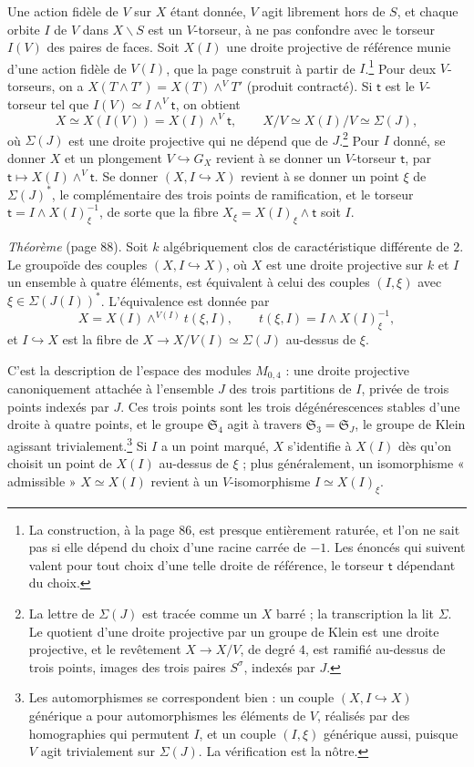 \documentclass[11pt,a4paper]{article}
\begin{document}
Une action fidèle de $V$ sur $X$ étant donnée, $V$ agit librement hors de $S$,
et chaque orbite $I$ de $V$ dans $X \smallsetminus S$ est un $V$-torseur, à ne
pas confondre avec le torseur $I(V)$ des paires de faces. Soit $X(I)$ une
droite projective de référence munie d'une action fidèle de $V(I)$, que la
page construit à partir de $I$.\footnote{La construction, à la page 86, est
presque entièrement raturée, et l'on ne sait pas si elle dépend du choix
d'une racine carrée de $-1$. Les énoncés qui suivent valent pour tout choix
d'une telle droite de référence, le torseur $\mathsf{t}$ dépendant du
choix.} Pour deux $V$-torseurs, on a $X(T \wedge T') = X(T) \wedge^{V} T'$ (produit
contracté). Si $\mathsf{t}$ est le $V$-torseur tel que $I(V) \simeq I
\wedge^{V} \mathsf{t}$, on obtient
\[
X \simeq X(I(V)) = X(I) \wedge^{V} \mathsf{t}, \qquad
X/V \simeq X(I)/V \simeq \Sigma(J),
\]
où $\Sigma(J)$ est une droite projective qui ne dépend que de
$J$.\footnote{La lettre de $\Sigma(J)$ est tracée comme un $X$ barré ; la
transcription la lit $\Sigma$. Le quotient d'une droite projective par un
groupe de Klein est une droite projective, et le revêtement
$X \to X/V$, de degré $4$, est ramifié au-dessus de trois points,
images des trois paires $S^{\sigma}$, indexés par $J$.} Pour $I$ donné, se
donner $X$ et un plongement $V \hookrightarrow G_X$ revient à se donner un
$V$-torseur $\mathsf{t}$, par $\mathsf{t} \mapsto X(I) \wedge^{V}
\mathsf{t}$. Se donner $(X, I \hookrightarrow X)$ revient à se donner un
point $\xi$ de $\Sigma(J)^{*}$, le complémentaire des trois points de
ramification, et le torseur $\mathsf{t} = I \wedge X(I)_\xi^{-1}$, de
sorte que la fibre $X_\xi = X(I)_\xi \wedge \mathsf{t}$ soit $I$.

\emph{Théorème} (page 88). Soit $k$ algébriquement clos de caractéristique
différente de $2$. Le groupoïde des couples $(X, I \hookrightarrow X)$, où
$X$ est une droite projective sur $k$ et $I$ un ensemble à quatre éléments,
est équivalent à celui des couples $(I, \xi)$ avec $\xi \in
\Sigma(J(I))^{*}$. L'équivalence est donnée par
\[
X = X(I) \wedge^{V(I)} t(\xi, I), \qquad t(\xi, I) = I \wedge
X(I)_\xi^{-1},
\]
et $I \hookrightarrow X$ est la fibre de $X \to X/V(I) \simeq \Sigma(J)$
au-dessus de $\xi$.

C'est la description de l'espace des modules $M_{0,4}$ : une droite
projective canoniquement attachée à l'ensemble $J$ des trois partitions de
$I$, privée de trois points indexés par $J$. Ces trois points sont les trois
dégénérescences stables d'une droite à quatre points, et le groupe
$\mathfrak{S}_4$ agit à travers $\mathfrak{S}_3 = \mathfrak{S}_J$, le groupe
de Klein agissant trivialement.\footnote{Les automorphismes se correspondent
bien : un couple $(X, I \hookrightarrow X)$ générique a pour automorphismes
les éléments de $V$, réalisés par des homographies qui permutent $I$, et un
couple $(I, \xi)$ générique aussi, puisque $V$ agit trivialement sur
$\Sigma(J)$. La vérification est la nôtre.} Si $I$ a un point marqué, $X$
s'identifie à $X(I)$ dès qu'on choisit un point de $X(I)$ au-dessus de $\xi$ ;
plus généralement, un isomorphisme « admissible » $X \simeq X(I)$ revient à un
$V$-isomorphisme $I \simeq X(I)_\xi$.
\end{document}
